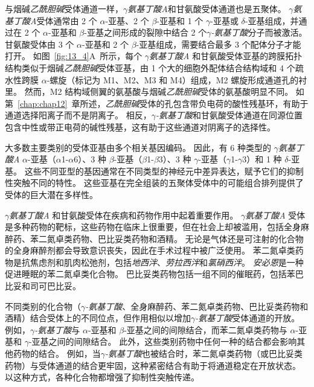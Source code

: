 与烟碱\textit{乙酰胆碱}受体通道一样，\textit{$\gamma$氨基丁酸A}和甘氨酸受体通道也是五聚体。
\textit{$\gamma$氨基丁酸A}受体通常由 2 个 $\alpha$-亚基、2 个 $\beta$-亚基和 1 个 $\gamma$-亚基或 $\delta$-亚基组成，并通过在 2 个 $\alpha$-亚基和 $\beta$-亚基之间形成的裂隙中结合 2 个\textit{$\gamma$-氨基丁酸}分子而被激活。
甘氨酸受体由 3 个 $\alpha$-亚基和 2 个 $\beta$-亚基组成，需要结合最多 3 个配体分子才能打开。
如图~\ref{fig:13_4}A~所示，每个 \textit{$\gamma$氨基丁酸A} 和甘氨酸受体亚基的跨膜拓扑结构类似于烟碱\textit{乙酰胆碱}受体亚基，由 1 个大的细胞外配体结合结构域和 4 个疏水性跨膜 $\alpha$-螺旋（标记为 M1、M2、M3 和 M4）组成，M2 螺旋形成通道孔的衬里。
然而，M2 结构域侧翼的氨基酸与烟碱\textit{乙酰胆碱}受体的氨基酸明显不同。
如第~\ref{chap:chap12}~章所述，\textit{乙酰胆碱}受体的孔包含带负电荷的酸性残基环，有助于通道选择阳离子而不是阴离子。
相反，\textit{$\gamma$-氨基丁酸}和甘氨酸受体通道在同源位置包含中性或带正电荷的碱性残基，这有助于这些通道对阴离子的选择性。


大多数主要类别的受体亚基由多个相关基因编码。
因此，有 6 种类型的 \textit{$\gamma$氨基丁酸A} $\alpha$-亚基（$\alpha$1-$\alpha$6）、3 种 $\beta$-亚基（$\beta$1-$\beta$3）、3 种 $\gamma$-亚基（$\gamma$1-$\gamma$3）和 1 种 $\delta$-亚基。
这些不同亚型的基因通常在不同类型的神经元中差异表达，赋予它们的抑制性突触不同的特性。
这些亚基在完全组装的五聚体受体中的可能组合排列提供了受体的巨大潜在多样性。


\textit{$\gamma$氨基丁酸A} 和甘氨酸受体在疾病和药物作用中起着重要作用。
\textit{$\gamma$氨基丁酸A} 受体是多种药物的靶标，这些药物在临床上很重要，但在社会上却被滥用，包括全身麻醉药、苯二氮卓类药物、巴比妥类药物和酒精。
无论是气体还是可注射的化合物的全身麻醉剂都会导致意识丧失，因此在手术过程中被广泛使用。
苯二氮卓类药物是抗焦虑剂和肌肉松弛剂，包括\textit{地西泮}、\textit{劳拉西泮}和\textit{氯硝西泮}。
\textit{安必恩}是一种促进睡眠的苯二氮卓类化合物。
巴比妥类药物包括一组不同的催眠药，包括苯巴比妥和司可巴比妥。


不同类别的化合物（\textit{$\gamma$-氨基丁酸}、全身麻醉药、苯二氮卓类药物、巴比妥类药物和酒精）结合受体上的不同位点，但作用相似以增加\textit{$\gamma$-氨基丁酸}受体通道的开放。
例如，\textit{$\gamma$-氨基丁酸}与 $\alpha$-亚基和 $\beta$-亚基之间的间隙结合，而苯二氮卓类药物与 $\alpha$-亚基和 $\gamma$-亚基之间的间隙结合。
此外，这些类别药物中任何一种的结合都会影响其他药物的结合。
例如，当\textit{$\gamma$-氨基丁酸}也被结合时，苯二氮卓类药物（或巴比妥类药物）与受体通道的结合更牢固，这种紧密结合有助于将通道稳定在开放状态。
以这种方式，各种化合物都增强了抑制性突触传递。


